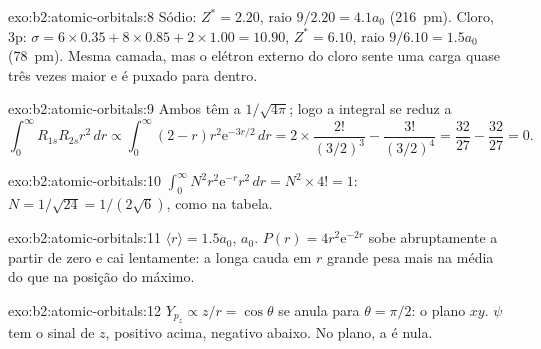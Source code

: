 \begin{solution}{exo:b2:atomic-orbitals:8}
Sódio: $Z^* = 2.20$, raio $9/2.20 = 4.1a_0$ (\qty{216}{pm}). Cloro, 3p:
$\sigma = 6 \times 0.35 + 8 \times 0.85 + 2 \times 1.00 = 10.90$, $Z^* = 6.10$, raio
$9/6.10 = 1.5a_0$ (\qty{78}{pm}). Mesma camada, mas o elétron externo do cloro
sente uma carga quase três vezes maior e é puxado para dentro.
\end{solution}

\begin{solution}{exo:b2:atomic-orbitals:9}
Ambos têm a  $1/\sqrt{4\pi}$; logo a integral se reduz a
\[
  \int_0^\infty R_{1s}R_{2s}r^2\,dr \propto \int_0^\infty (2 - r)r^2\mathrm e^{-3r/2}\,dr =
  2 \times \frac{2!}{(3/2)^3} - \frac{3!}{(3/2)^4} = \frac{32}{27} - \frac{32}{27} = 0 .
\]
\end{solution}

\begin{solution}{exo:b2:atomic-orbitals:10}
$\int_0^\infty N^2r^2\mathrm e^{-r}r^2\,dr = N^2 \times 4! = 1$: $N = 1/\sqrt{24} =
1/(2\sqrt6)$, como na tabela.
\end{solution}

\begin{solution}{exo:b2:atomic-orbitals:11}
$\langle r\rangle = 1.5a_0$,  $a_0$. $P(r) = 4r^2\mathrm e^{-2r}$ sobe
abruptamente a partir de zero e cai lentamente: a longa cauda em $r$ grande
pesa mais na média do que na posição do máximo.
\end{solution}

\begin{solution}{exo:b2:atomic-orbitals:12}
$Y_{p_z} \propto z/r = \cos\theta$ se anula para $\theta = \pi/2$: o plano $xy$.
$\psi$ tem o sinal de $z$, positivo acima, negativo abaixo. No plano, a
 é nula.
\end{solution}


